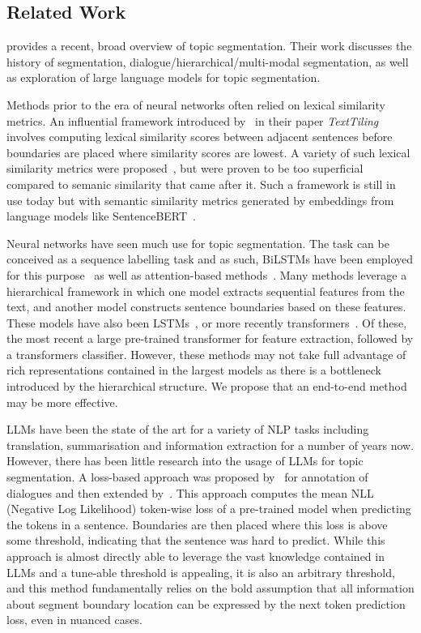 \subsection{Related Work}

\citep{XingThesis} provides a recent, broad overview of topic segmentation. Their work discusses the history of segmentation, dialogue/hierarchical/multi-modal segmentation, as well as exploration of large language models for topic segmentation.

Methods prior to the era of neural networks often relied on lexical similarity metrics. An influential framework introduced by~\citep{TextTiling} in their paper \emph{TextTiling} involves computing lexical similarity scores between adjacent sentences before boundaries are placed where similarity scores are lowest. A variety of such lexical similarity metrics were proposed~\citep{lexical1,lexical2}, but were proven to be too superficial compared to semanic similarity that came after it. Such a framework is still in use today but with semantic similarity metrics generated by embeddings from language models like SentenceBERT~\citep{SentenceBERT}.

Neural networks have seen much use for topic segmentation. The task can be conceived as a sequence labelling task and as such, BiLSTMs have been employed for this purpose~\citep{BiLSTM} as well as attention-based methods~\cite{CrossAttentionHierarchical}. Many methods leverage a hierarchical framework in which one model extracts sequential features from the text, and another model constructs sentence boundaries based on these features. These models have also been LSTMs~\cite{HierarchicalBiLSTM,CNNFeaturesLSTMAttention}, or more recently transformers~\citep{TwoLevelTransformerSoftmax,TwoLevelTransformerPretrained}. Of these, the most recent a large pre-trained transformer for feature extraction, followed by a transformers classifier. However, these methods may not take full advantage of rich representations contained in the largest models as there is a bottleneck introduced by the hierarchical structure. We propose that an end-to-end  method may be more effective.

LLMs have been the state of the art for a variety of NLP tasks including translation, summarisation and information extraction for a number of years now. However, there has been little research into the usage of LLMs for topic segmentation. A loss-based approach was proposed by~\citep{DialoGPT} for annotation of dialogues and then extended by~\citep{XingThesis}. This approach computes the mean NLL (Negative Log Likelihood) token-wise loss of a pre-trained model when predicting the tokens in a sentence. Boundaries are then placed where this loss is above some threshold, indicating that the sentence was hard to predict. While this approach is almost directly able to leverage the vast knowledge contained in LLMs and a tune-able threshold is appealing, it is also an arbitrary threshold, and this method fundamentally relies on the bold assumption that all information about segment boundary location can be expressed by the next token prediction loss, even in nuanced cases.

